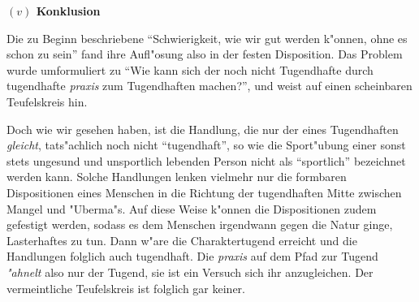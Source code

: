\documentclass[a4paper, emulatestandardclasses, 12pt]{scrartcl}
\begin{document}
\begin{onehalfspace}
\vspace{6mm}
\noindent\textbf{$(v)$ Konklusion}	

\noindent Die zu Beginn beschriebene "`Schwierigkeit, wie wir gut werden k"onnen, ohne es schon zu sein"' fand ihre Aufl"osung also in der festen Disposition. Das Problem wurde umformuliert zu "`Wie kann sich der noch nicht Tugendhafte durch tugendhafte \emph{praxis} zum Tugendhaften machen?"', und weist auf einen scheinbaren Teufelskreis hin. 

Doch wie wir gesehen haben, ist die Handlung, die nur der eines Tugendhaften \emph{gleicht}, tats"achlich noch nicht "`tugendhaft"', so wie die Sport"ubung einer sonst stets ungesund und unsportlich lebenden Person nicht als "`sportlich"' bezeichnet werden kann. Solche Handlungen lenken vielmehr nur die formbaren Dispositionen eines Menschen in die Richtung der tugendhaften Mitte zwischen Mangel und "Uberma"s. Auf diese Weise k"onnen die Dispositionen zudem gefestigt werden, sodass es dem Menschen irgendwann gegen die Natur ginge, Lasterhaftes zu tun. Dann w"are die Charaktertugend erreicht und die Handlungen folglich auch tugendhaft. Die \emph{praxis} auf dem Pfad zur Tugend \emph{"ahnelt} also nur der Tugend, sie ist ein Versuch sich ihr anzugleichen. Der vermeintliche Teufelskreis ist folglich gar keiner.

\end{onehalfspace}
\nocite{*}

\end{document}

